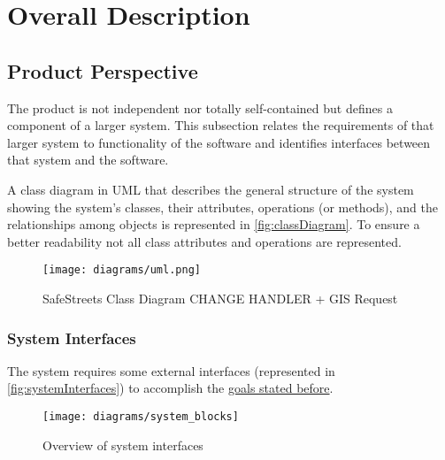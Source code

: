 \section{Overall Description}

\subsection{Product Perspective}
	
	The product is not independent nor totally self-contained but defines a component of a larger system. This subsection relates the requirements of that larger system to functionality of the software and identifies interfaces between that system and the software.
	
	A class diagram in UML that describes the general structure of the system showing the system's classes, their attributes, operations (or methods), and the relationships among objects is represented in \autoref{fig:classDiagram}. To ensure a better readability not all class attributes and operations are represented. \newline \newline
		
	\begin{figure}[h]
			\centering
			\texttt{[image: diagrams/uml.png]}
			\caption{
				\label{fig:classDiagram} 
				SafeStreets Class Diagram CHANGE HANDLER + GIS Request
			}
		\end{figure}
		
	\subsubsection{System Interfaces}
	\label{sec:systemInterfaces}
		The system requires some external interfaces (represented in \autoref{fig:systemInterfaces}) to accomplish the \hyperref[sec:goals]{goals stated before}. \newline \newline
		\begin{figure}[h]
			\centering
			\texttt{[image: diagrams/system\_blocks]}
			\caption{
				\label{fig:systemInterfaces} 
				Overview of system interfaces
			}
		\end{figure} 
\clearpage			

